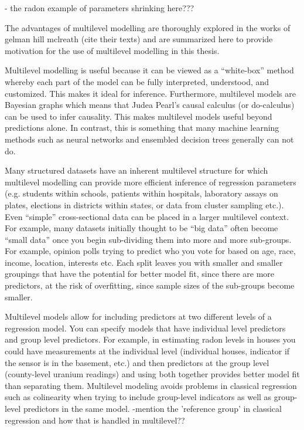 - the radon example of parameters shrinking here???

The advantages of multilevel modelling are thoroughly explored in the works of gelman hill mclreath (cite their texts) and are summarized here to provide motivation for the use of multilevel modelling in this thesis.

Multilevel modelling is useful because it can be viewed as a “white-box” method whereby each part of the model can be fully interpreted, understood, and customized. This makes it ideal for inference. Furthermore, multilevel models are Bayesian graphs which means that Judea Pearl’s causal calculus (or do-calculus) can be used to infer causality. This makes multilevel models useful beyond predictions alone. In contrast, this is something that many machine learning methods such as neural networks and ensembled decision trees generally can not do.

Many structured datasets have an inherent multilevel structure for which multilevel modelling can provide more efficient inference of regression parameters (e.g. students within schools, patients within hospitals, laboratory assays on plates, elections in districts within states, or data from cluster sampling etc.). Even “simple” cross-sectional data can be placed in a larger multilevel context. For example, many datasets initially thought to be “big data” often become “small data” once you begin sub-dividing them into more and more sub-groups. For example, opinion polls trying to predict who you vote for based on age, race, income, location, interests etc. Each split leaves you with smaller and smaller groupings that have the potential for better model fit, since there are more predictors, at the risk of overfitting, since sample sizes of the sub-groups become smaller.

Multilevel models allow for including predictors at two different levels of a regression model. You can specify models that have individual level predictors and group level predictors. For example, in estimating radon levels in houses you could have measurements at the individual level (individual houses, indicator if the sensor is in the basement, etc.) and then predictors at the group level (county-level uranium readings) and using both together provides better model fit than separating them. Multilevel modeling avoids problems in classical regression such as colinearity when trying to include group-level indicators as well as group-level predictors in the same model. -mention the 'reference group' in classical regression and how that is handled in multilevel??

